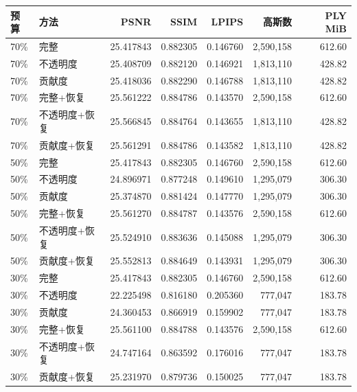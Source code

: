 \begin{center}
\small
\begin{tabular}{llrrrrr}
\toprule
预算 & 方法 & PSNR & SSIM & LPIPS & 高斯数 & PLY MiB \\
\midrule
70\% & 完整 & 25.417843 & 0.882305 & 0.146760 & 2,590,158 & 612.60 \\
70\% & 不透明度 & 25.408709 & 0.882120 & 0.146921 & 1,813,110 & 428.82 \\
70\% & 贡献度 & 25.418036 & 0.882290 & 0.146788 & 1,813,110 & 428.82 \\
70\% & 完整+恢复 & 25.561222 & 0.884786 & 0.143570 & 2,590,158 & 612.60 \\
70\% & 不透明度+恢复 & 25.566845 & 0.884764 & 0.143655 & 1,813,110 & 428.82 \\
70\% & 贡献度+恢复 & 25.561291 & 0.884786 & 0.143582 & 1,813,110 & 428.82 \\
50\% & 完整 & 25.417843 & 0.882305 & 0.146760 & 2,590,158 & 612.60 \\
50\% & 不透明度 & 24.896971 & 0.877248 & 0.149610 & 1,295,079 & 306.30 \\
50\% & 贡献度 & 25.374870 & 0.881424 & 0.147770 & 1,295,079 & 306.30 \\
50\% & 完整+恢复 & 25.561270 & 0.884787 & 0.143576 & 2,590,158 & 612.60 \\
50\% & 不透明度+恢复 & 25.524910 & 0.883636 & 0.145088 & 1,295,079 & 306.30 \\
50\% & 贡献度+恢复 & 25.552813 & 0.884649 & 0.143931 & 1,295,079 & 306.30 \\
30\% & 完整 & 25.417843 & 0.882305 & 0.146760 & 2,590,158 & 612.60 \\
30\% & 不透明度 & 22.225498 & 0.816180 & 0.205360 & 777,047 & 183.78 \\
30\% & 贡献度 & 24.360453 & 0.866919 & 0.159902 & 777,047 & 183.78 \\
30\% & 完整+恢复 & 25.561100 & 0.884788 & 0.143576 & 2,590,158 & 612.60 \\
30\% & 不透明度+恢复 & 24.747164 & 0.863592 & 0.176016 & 777,047 & 183.78 \\
30\% & 贡献度+恢复 & 25.231970 & 0.879736 & 0.150025 & 777,047 & 183.78 \\
\bottomrule
\end{tabular}
\end{center}

